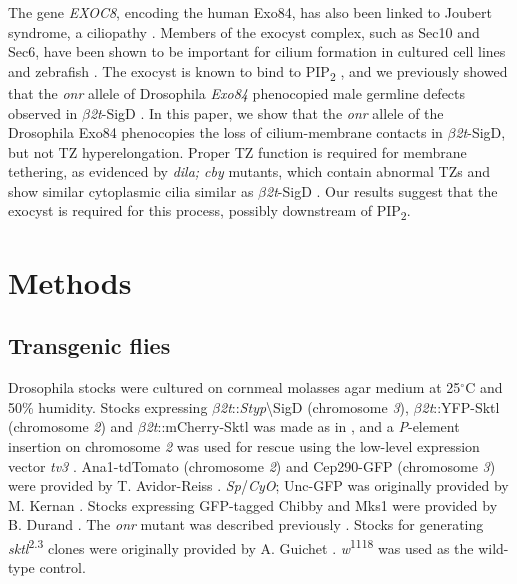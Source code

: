 \documentclass[12pt, twoside, letterpaper]{article}
\newcommand{\PIP}{PIP\textsubscript{2}}
\newcommand{\sigd}{$\beta$\textit{2t}-SigD}
\begin{document}
\begin{doublespacing}
\begin{linenumbers}
    The gene \textit{EXOC8}, encoding the human Exo84, has also
    been linked to Joubert syndrome, a ciliopathy
    \citep{dixon2012exome}.
    Members of the exocyst complex, such as Sec10 and Sec6, have been shown
    to be important for cilium formation in cultured cell lines and zebrafish
    \citep{zuo2009exocyst, lobo2017exocyst, seixas2016arl13b}.
    The exocyst is known to bind to \PIP{}
    \citep{he2007exo70, zhang2008membrane}, and we previously showed that
    the \textit{onr} allele of Drosophila \textit{Exo84} phenocopied
    male germline defects observed in \sigd{} \citep{fabian2010phosphatidylinositol}.
    In this paper, we show that the \textit{onr} allele of the Drosophila Exo84
    phenocopies the loss of cilium-membrane contacts in \sigd{},
    but not TZ hyperelongation.
    Proper TZ function is required for membrane tethering, as evidenced by
    \textit{dila; cby} mutants, which contain abnormal TZs
    and show similar cytoplasmic cilia similar as \sigd{} \citep{vieillard2016transition}.
    Our results suggest that the exocyst is required for this process,
    possibly downstream of \PIP{}.

    \section{Methods}
    \subsection{Transgenic flies}
    Drosophila stocks were cultured on cornmeal molasses agar medium at 25$^{\circ}$C
    and 50\% humidity.
    Stocks expressing $\beta$\textit{2t}::\textit{Styp}\textbackslash{SigD} (chromosome \textit{3}),
    $\beta$\textit{2t}::YFP-Sktl (chromosome \textit{2}) and
    $\beta$\textit{2t}::mCherry-Sktl was made as in \citep{wei2008depletion},
    and a \textit{P}-element insertion on chromosome \textit{2} was used for rescue using the low-level
    expression vector \textit{tv3} \citep{wong2005pip2}.
    Ana1-tdTomato (chromosome \textit{2}) and Cep290-GFP (chromosome \textit{3}) were provided
    by T. Avidor-Reiss \citep{basiri2014migrating}.
    \textit{Sp}/\textit{CyO}; Unc-GFP was originally provided by M. Kernan \citep{baker2004mechanosensory}.
    Stocks expressing GFP-tagged Chibby and Mks1 were
    provided by B. Durand \citep{enjolras2012drosophila, vieillard2016transition}.
    The \textit{onr} mutant was described previously \citep{giansanti2015exocyst}.
    Stocks for generating \textit{sktl}\textsuperscript{2.3} clones were originally provided by
    A. Guichet \citep{gervais2008pip5k}.
    \textit{w}\textsuperscript{1118} was used as the wild-type control.


\end{linenumbers}
\end{doublespacing}
\end{document}
